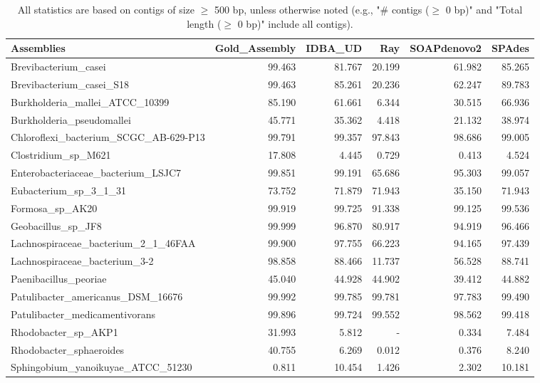 \documentclass[12pt,a4paper]{article}
\begin{document}
\begin{table}[ht]
\begin{center}
\caption{All statistics are based on contigs of size $\geq$ 500 bp, unless otherwise noted (e.g., "\# contigs ($\geq$ 0 bp)" and "Total length ($\geq$ 0 bp)" include all contigs).}
\begin{tabular}{|l*{5}{|r}|}
\hline
Assemblies & Gold\_Assembly & IDBA\_UD & Ray & SOAPdenovo2 & SPAdes \\ \hline
Brevibacterium\_casei & 99.463 & 81.767 & 20.199 & 61.982 & 85.265 \\ \hline
Brevibacterium\_casei\_S18 & 99.463 & 85.261 & 20.236 & 62.247 & 89.783 \\ \hline
Burkholderia\_mallei\_ATCC\_10399 & 85.190 & 61.661 & 6.344 & 30.515 & 66.936 \\ \hline
Burkholderia\_pseudomallei & 45.771 & 35.362 & 4.418 & 21.132 & 38.974 \\ \hline
Chloroflexi\_bacterium\_SCGC\_AB-629-P13 & 99.791 & 99.357 & 97.843 & 98.686 & 99.005 \\ \hline
Clostridium\_sp\_M621 & 17.808 & 4.445 & 0.729 & 0.413 & 4.524 \\ \hline
Enterobacteriaceae\_bacterium\_LSJC7 & 99.851 & 99.191 & 65.686 & 95.303 & 99.057 \\ \hline
Eubacterium\_sp\_3\_1\_31 & 73.752 & 71.879 & 71.943 & 35.150 & 71.943 \\ \hline
Formosa\_sp\_AK20 & 99.919 & 99.725 & 91.338 & 99.125 & 99.536 \\ \hline
Geobacillus\_sp\_JF8 & 99.999 & 96.870 & 80.917 & 94.919 & 96.466 \\ \hline
Lachnospiraceae\_bacterium\_2\_1\_46FAA & 99.900 & 97.755 & 66.223 & 94.165 & 97.439 \\ \hline
Lachnospiraceae\_bacterium\_3-2 & 98.858 & 88.466 & 11.737 & 56.528 & 88.741 \\ \hline
Paenibacillus\_peoriae & 45.040 & 44.928 & 44.902 & 39.412 & 44.882 \\ \hline
Patulibacter\_americanus\_DSM\_16676 & 99.992 & 99.785 & 99.781 & 97.783 & 99.490 \\ \hline
Patulibacter\_medicamentivorans & 99.896 & 99.724 & 99.552 & 98.562 & 99.418 \\ \hline
Rhodobacter\_sp\_AKP1 & 31.993 & 5.812 & - & 0.334 & 7.484 \\ \hline
Rhodobacter\_sphaeroides & 40.755 & 6.269 & 0.012 & 0.376 & 8.240 \\ \hline
Sphingobium\_yanoikuyae\_ATCC\_51230 & 0.811 & 10.454 & 1.426 & 2.302 & 10.181 \\ \hline

\end{tabular}
\end{center}
\end{table}
\end{document}
